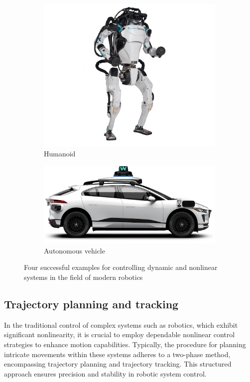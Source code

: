 \begin{figure}[H]
    \begin{subfigure}[b]{0.45\textwidth}
        \includegraphics[width=\textwidth]{figures/humanoid.jpg}
        \caption{Humanoid}
        \label{fig:image3}
    \end{subfigure}
    \hfill
    \begin{subfigure}[b]{0.45\textwidth}
        \includegraphics[width=\textwidth]{figures/waymo.png}
        \caption{Autonomous vehicle}
        \label{fig:image4}
    \end{subfigure}
    \caption{Four successful examples for controlling dynamic and nonlinear systems in the field of modern robotics}
    \label{fig:four_images}
\end{figure}

\subsection{Trajectory planning and tracking}
In the traditional control of complex systems such as robotics, which exhibit significant nonlinearity, it is crucial to employ dependable nonlinear control strategies to enhance motion capabilities. Typically, the procedure for planning intricate movements within these systems adheres to a two-phase method\cite{biagiotti2008trajectory}, encompassing trajectory planning and trajectory tracking. This structured approach ensures precision and stability in robotic system control.

